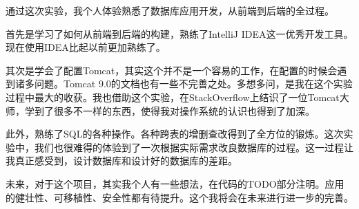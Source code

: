\documentclass[../report.tex]{subfiles}
\begin{document}
通过这次实验，我个人体验熟悉了数据库应用开发，从前端到后端的全过程。

首先是学习了如何从前端到后端的构建，熟练了IntelliJ IDEA这一优秀开发工具。现在使用IDEA比起以前更加熟练了。

其次是学会了配置Tomcat，其实这个并不是一个容易的工作，在配置的时候会遇到诸多问题。Tomcat 9.0的文档也有一些不完善之处。多想多问，是我在这个实验过程中最大的收获。我也借助这个实验，在StackOverflow上结识了一位Tomcat大师，学到了很多不一样的东西，使得我对操作系统的认识也得到了加深。

此外，熟练了SQL的各种操作。各种跨表的增删查改得到了全方位的锻炼。这次实验中，我们也很难得的体验到了一次根据实际需求改良数据库的过程。这一过程让我真正感受到，设计数据库和设计好的数据库的差距。

未来，对于这个项目，其实我个人有一些想法，在代码的TODO部分注明。应用的健壮性、可移植性、安全性都有待提升。这个我将会在未来进行进一步的完善。
\end{document}
